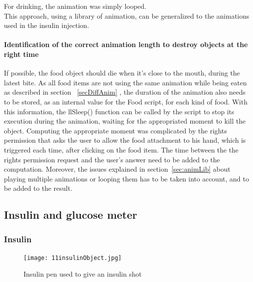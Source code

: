 {For drinking, the animation was simply looped.\\

This approach, using a library of animation, can be generalized to the animations used in the insulin injection.

	\paragraph{Identification of the correct animation length to destroy objects at the right time}
\label{sec:animBite}
If possible, the food object should die when it's close to the mouth, during the latest bite. As all food items are not using the same animation while being eaten as described in section ~\ref{secDiffAnim} , the duration of the animation also needs to be stored, as an internal value for the Food script, for each kind of food. With this information, the llSleep() function can be called by the script to stop its execution during the animation, waiting for the appropriated moment to kill the object. 
Computing the appropriate moment was complicated by the rights permission that asks the user to allow the food attachment to his hand, which is triggered each time, after clicking on the food item. The time between the the rights permission request and the user's answer need to be added to the computation. Moreover, the issues explained in section~\ref{sec:animLib} about playing multiple animations or looping them has to be taken into account, and to be added to the result.\\

\subsection{Insulin and glucose meter}
	\subsubsection{Insulin} 

\begin{figure}[h]
  \caption{Insulin pen used to give an insulin shot}
  \centering
  \texttt{[image: 11insulinObject.jpg]}
  \label{fig:11insulinObject}
\end{figure}

}

